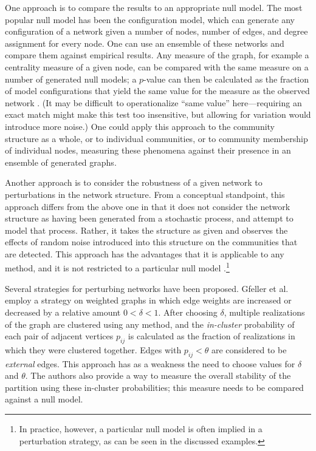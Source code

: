 One approach is to compare the results to an appropriate null model. The
most popular null model has been the configuration model, which can
generate any configuration of a network given a number of nodes, number
of edges, and degree assignment for every node. One can use an ensemble
of these networks and compare them against empirical results. Any
measure of the graph, for example a centrality measure of a given node,
can be compared with the same measure on a number of generated null
models; a \(p\)-value can then be calculated as the fraction of model
configurations that yield the same value for the measure as the observed
network \autocite{fortunato_community_2016}. (It may be difficult to
operationalize ``same value'' here---requiring an exact match might make
this test too insensitive, but allowing for variation would introduce
more noise.) One could apply this approach to the community structure as
a whole, or to individual communities, or to community membership of
individual nodes, measuring these phenomena against their presence in an
ensemble of generated graphs.

Another approach is to consider the robustness of a given network to
perturbations in the network structure. From a conceptual standpoint,
this approach differs from the above one in that it does not consider
the network structure as having been generated from a stochastic
process, and attempt to model that process. Rather, it takes the
structure as given and observes the effects of random noise introduced
into this structure on the communities that are detected. This approach
has the advantages that it is applicable to any method, and it is not
restricted to a particular null model
\autocites{rosvall_mapping_2010}{mirshahvalad_significant_2012}.\footnote{In
  practice, however, a particular null model is often implied in a
  perturbation strategy, as can be seen in the discussed examples.}

Several strategies for perturbing networks have been proposed. Gfeller
et al. \autocite{gfeller_finding_2005} employ a strategy on weighted
graphs in which edge weights are increased or decreased by a relative
amount \(0 < \delta < 1\). After choosing \(\delta\), multiple
realizations of the graph are clustered using any method, and the
\emph{in-cluster} probability of each pair of adjacent vertices
\(p_{ij}\) is calculated as the fraction of realizations in which they
were clustered together. Edges with \(p_{ij} < \theta\) are considered
to be \emph{external} edges. This approach has as a weakness the need to
choose values for \(\delta\) and \(\theta\). The authors also provide a
way to measure the overall stability of the partition using these
in-cluster probabilities; this measure needs to be compared against a
null model.

